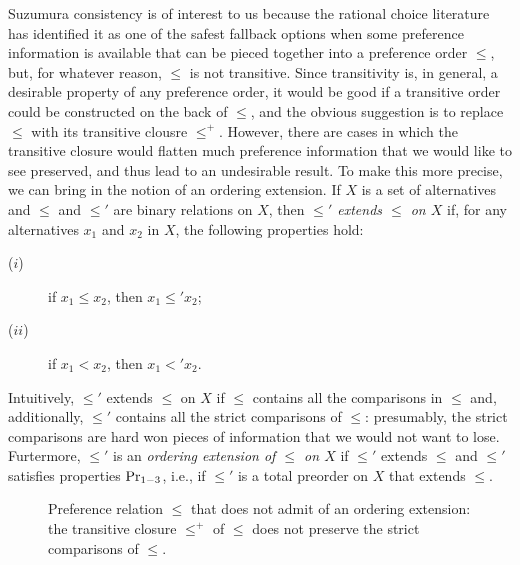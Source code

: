 Suzumura consistency is of interest to us 
because the rational choice literature has 
identified it as one of the safest fallback options 
when some preference information is available that 
can be pieced together into a preference order $\le$, 
but, for whatever reason, $\le$ is not transitive.
Since transitivity is, in general, a desirable property of any 
preference order, it would be good if a transitive order 
could be constructed on the back of $\le$,
and the obvious suggestion is to replace $\le$ with its 
transitive clousre $\le^+$.
However, there are cases in which the transitive closure would 
flatten much preference information that we would like to 
see preserved, and thus lead to an undesirable result.
To make this more precise, we can bring in the notion of 
an ordering extension.
If $X$ is a set of alternatives 
and $\le$ and $\le'$ are binary relations on $X$,
then \emph{$\le'$ extends $\le$ on $X$} if, for any alternatives 
$x_{1}$ and $x_{2}$ in $X$, the following properties hold:
\begin{description}
	\item[($i$)] if $x_1\le x_2$, then $x_1\le' x_2$;
	\item[($ii$)] if $x_1 < x_2$, then $x_{1}<' x_{2}$.
\end{description}
Intuitively, $\le'$ extends $\le$ on $X$ if $\le$ contains all the 
comparisons in $\le$ and, additionally, 
$\le'$ contains all the strict comparisons of $\le$:
presumably, the strict comparisons are hard won pieces of information 
that we would not want to lose.
Furtermore, $\le'$ is an \emph{ordering extension of $\le$ on $X$}
if $\le'$ extends $\le$ and $\le'$ satisfies properties $\mathrm{Pr}_{1-3}$,
i.e., if $\le'$ is a total preorder on $X$ that extends $\le$.

\begin{figure}
\centering
{}	
\caption{
	Preference relation $\le$ that does not admit of an 
	ordering extension: the transitive closure $\le^+$ of $\le$
	does not preserve the strict comparisons of $\le$.
}
\label{fig:2-sc}
\end{figure}

